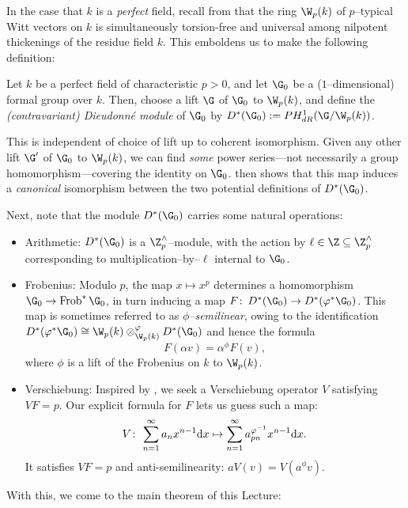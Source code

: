 In the case that \(k\) is a \emph{perfect} field, recall from  that the ring \(\W_p(k)\) of \(p\)--typical Witt vectors on \(k\) is simultaneously torsion-free and universal among nilpotent thickenings of the residue field \(k\).
This emboldens us to make the following definition:

\begin{definition}{\cite[Section 5.5]{Katz}}\label{ContravariantDieudonneDefn}
Let \(k\) be a perfect field of characteristic \(p > 0\), and let \(\G_0\) be a (\(1\)--dimensional) formal group over \(k\).
Then, choose a lift \(\G\) of \(\G_0\) to \(\W_p(k)\), and define the \textit{(contravariant) Dieudonn\'e module} of \(\G_0\) by \(D^*(\G_0) := PH^1_{dR}(\G / \W_p(k))\).
\end{definition}

\begin{remark}
This is independent of choice of lift up to coherent isomorphism.
Given any other lift \(\G'\) of \(\G_0\) to \(\W_p(k)\), we can find \emph{some} power series---not necessarily a group homomorphism---covering the identity on \(\G_0\).
 then shows that this map induces a \emph{canonical} isomorphism between the two potential definitions of \(D^*(\G_0)\).
\end{remark}

Next, note that the module \(D^*(\G_0)\) carries some natural operations:
\begin{itemize}
\item Arithmetic: \(D^*(\G_0)\) is a \(\Z^\wedge_p\)--module, with the action by \(\ell \in \Z \subseteq \Z^\wedge_p\) corresponding to multiplication--by--\(\ell\) internal to \(\G_0\).
\item {}Frobenius: Modulo \(p\), the map \(x \mapsto x^p\) determines a homomorphism \(\G_0 \to \operatorname{Frob}^* \G_0\), in turn inducing a map \(F\co D^*(\G_0) \to D^*(\phi^* \G_0)\).
This map is sometimes referred to as \textit{\(\phi\)--semilinear}, owing to the identification \(D^*(\phi^* \G_0) \cong \W_p(k) \otimes^\phi_{\W_p(k)} D^*(\G_0)\) and hence the formula \[F(\alpha v) = \alpha^\phi F(v),\] where \(\phi\) is a lift of the Frobenius on \(k\) to \(\W_p(k)\).
\item {}Verschiebung: Inspired by , we seek a Verschiebung operator \(V\) satisfying \(VF = p\).
Our explicit formula for \(F\) lets us guess such a map: \[V\colon\thinspace \sum_{n=1}^\infty a_n x^{n-1} \mathrm{d}x \mapsto \sum_{n=1}^\infty a_{pn}^{\varphi^{-1}} x^{n-1} \mathrm{d}x.\]
It satisfies \(VF = p\) and anti-semilinearity: \(aV(v) = V(a^\phi v)\).
\end{itemize}
With this, we come to the main theorem of this Lecture:

